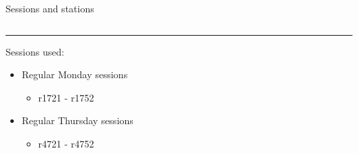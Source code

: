 \documentclass{beamer}
\begin{document}
    \begin{frame}{Sessions and stations}
    
        \begin{columns}[T] %
            \begin{column}{.48\textwidth}
            \color{black}\rule{\linewidth}{4pt}

                Sessions used:

                \begin{itemize}
                    \item Regular Monday sessions
                    \begin{itemize}
                        \item r1721 - r1752 
                    \end{itemize}
                    \item Regular Thursday sessions
                    \begin{itemize}
                        \item r4721 - r4752 
                    \end{itemize}
                \end{itemize}


\end{column}
\end{columns}
\end{frame}
\end{document}

